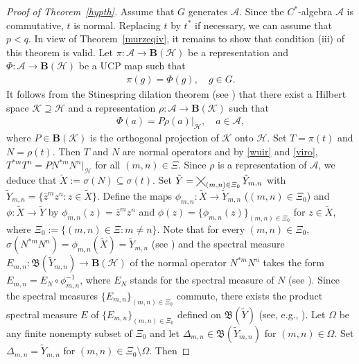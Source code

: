 \documentclass[reqno]{amsproc}
\DeclareMathOperator*{\smallcross}{\smallCross}
\numberwithin{equation}{section}
\theoremstyle{remark}
\newcommand*{\ascr}{\mathscr{A}}
\newcommand*{\hh}{\mathcal{H}}
\newcommand*{\kk}{\mathcal{K}}
\newcommand{\smallCross}{\mathbin{\tikz [x=1.1ex,y=1.1ex,line width=.15ex,
   baseline={([yshift=-0.6ex]current bounding
   box.center)}]
   \draw (-1,-1) -- (1,1) (-1,1) -- (1,-1);}}%
\newcommand*{\borel}{\mathfrak{B}}
\theoremstyle{definition}
\newcommand*{\ogr}{\boldsymbol{B}}
\begin{document}
   \begin{proof}[Proof of Theorem~\ref{hypth}]
Assume that $G$ generates $\ascr$. Since the
$C^*$-algebra $\ascr$ is commutative, $t$ is normal.
Replacing $t$ by $t^*$ if necessary, we can assume
that $p<q$. In view of Theorem~\ref{murzeqiv}, it
remains to show that condition (iii) of this theorem
is valid. Let $\pi\colon \ascr\to \ogr(\hh)$ be a
representation and $\varPhi\colon \ascr \to \ogr(\hh)$
be a UCP map such that
   \begin{align} \label{wuir}
\pi(g) = \varPhi(g), \quad g\in G.
   \end{align}
It follows from the Stinespring dilation theorem (see
\cite[Theorem~1]{Sti55}) that there exist a Hilbert
space $\kk\supseteq \hh$ and a representation
$\rho\colon \ascr \to \ogr(\kk)$ such that
   \begin{align} \label{viro}
\varPhi(a)= P\rho(a)|_{\hh}, \quad a \in
\ascr,
   \end{align}
where $P\in \ogr(\kk)$ is the orthogonal projection of
$\kk$ onto $\hh$. Set $T=\pi(t)$ and $N=\rho(t)$. Then
$T$ and $N$ are normal operators and by \eqref{wuir}
and \eqref{viro}, $T^{*m}T^n = PN^{*m}N^n|_{\hh}$ for
all $(m,n) \in \varXi$. Since $\rho$ is a
representation of $\ascr$, we deduce that $\tilde
X:=\sigma(N) \subseteq \sigma(t)$. Set $\tilde Y=
\smallcross_{(m,n)\in \varXi_0} \tilde Y_{m,n}$ with
$\tilde Y_{m,n}=\{\bar z^{m} z^n\colon z\in \tilde
X\}$. Define the maps $\phi_{m,n}\colon \tilde X \to
\tilde Y_{m,n}$ ($(m,n)\in \varXi_0$) and $\phi\colon
\tilde X \to \tilde Y$ by $\phi_{m,n}(z)=\bar z^{m}
z^n$ and $\phi(z) = \{\phi_{m,n}(z)\}_{(m,n)\in
\varXi_0}$ for $z \in \tilde X$, where
$\varXi_0:=\{(m,n) \in \varXi\colon m\neq n\}$. Note
that for every $(m,n)\in \varXi_0$, $\sigma(N^{*m}N^n)
= \phi_{m,n}(\tilde X)=\tilde Y_{m,n}$ (see \cite[(14)
on p.\ 158]{Bir-Sol87}) and the spectral measure
$E_{m,n}\colon \borel(\tilde Y_{m,n}) \to \ogr(\hh)$
of the normal operator $N^{*m}N^n$ takes the form
$E_{m,n}=E_N \circ \phi_{m,n}^{-1}$, where $E_N$
stands for the spectral measure of $N$ (see
\cite[Theorem~6.6.4]{Bir-Sol87}). Since the spectral
measures $\{E_{m,n}\}_{(m,n)\in \varXi_0}$ commute,
there exists the product spectral measure $E$ of
$\{E_{m,n}\}_{(m,n)\in \varXi_0}$ defined on
$\borel(\tilde Y)$ (see, e.g.,
\cite[Proposition~4]{Sto87}). Let $\varOmega$ be any
finite nonempty subset of $\varXi_0$ and let
$\varDelta_{m,n} \in \borel(\tilde Y_{m,n})$ for
$(m,n)\in \varOmega$. Set $\varDelta_{m,n}=\tilde
Y_{m,n}$ for $(m,n)\in \varXi_0 \setminus \varOmega$.
Then
   \allowdisplaybreaks

\end{proof}
\end{document}
